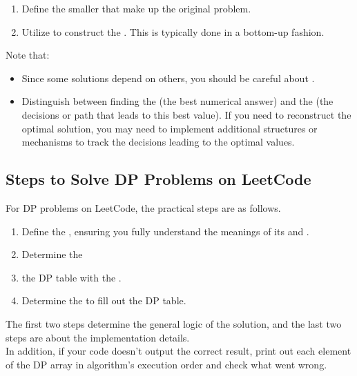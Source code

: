 \begin{enumerate}
\item Define the smaller {\color{blue}{subproblems}} that make up the original problem.
\item Utilize {\color{blue}{solutions to the smaller subproblems}} to construct the {\color{blue}{solution the solution to the original problem}}. This is typically done in a bottom-up fashion.
\end{enumerate}

Note that:
\begin{itemize}
\item Since some solutions depend on others, you should be careful about {\color{blue}{the order in which you solve the subproblems}}.
\item Distinguish between finding the {\color{blue}{optimal value}} (the best numerical answer) and the {\color{blue}{optimal solution}} (the decisions or path that leads to this best value). If you need to reconstruct the optimal solution, you may need to implement additional structures or mechanisms to track the decisions leading to the optimal values.
\end{itemize}

\subsection{Steps to Solve DP Problems on LeetCode}
For DP problems on LeetCode, the practical steps are as follows.
\begin{enumerate}
\item Define the {\color{blue}{DP table}}, ensuring you fully understand the meanings of its {\color{blue}{elements}} and {\color{blue}{subscripts}}.
\item Determine the {\color{blue}{transition function}}
\item {\color{blue}{Initialize}} the DP table with the {\color{blue}{base cases}}.
\item Determine the {\color{blue}{order}} to fill out the DP table.
\end{enumerate}

The first two steps determine the general logic of the solution, and the last two steps are about the implementation details.\\

In addition, if your code doesn't output the correct result, print out each element of the DP array in algorithm's execution order and check what went wrong.

